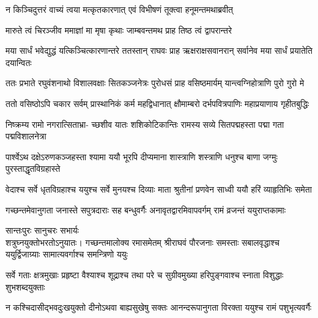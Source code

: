 \twolineshloka
{न किञ्चिदुत्तरं वाच्यं त्वया मत्कृतकारणात्}
{एवं विभीषणं तूक्त्वा हनूमन्तमथाब्रवीत्} %

\twolineshloka
{मारुते त्वं चिरञ्जीव ममाज्ञां मा मृषा कृथाः}
{जाम्बवन्तमथ प्राह तिष्ठ त्वं द्वापरान्तरे} %

\threelineshloka
{मया सार्धं भवेद्युद्धं यत्किञ्चित्कारणान्तरे}
{ततस्तान् राघवः प्राह ऋक्षराक्षसवानरान्}
{सर्वानेव मया सार्धं प्रयातेति दयान्वितः} %

\fourlineindentedshloka
{ततः प्रभाते रघुवंशनाथो}
{विशालवक्षाः सितकञ्जनेत्रः}
{पुरोधसं प्राह वसिष्ठमार्यम्}
{यान्त्वग्निहोत्राणि पुरो गुरो मे} %

\fourlineindentedshloka
{ततो वसिष्ठोऽपि चकार सर्वम्}
{प्रास्थानिकं कर्म महद्विधानात्}
{क्षौमाम्बरो दर्भपवित्रपाणिः}
{महाप्रयाणाय गृहीतबुद्धिः} %

\fourlineindentedshloka
{निष्क्रम्य रामो नगरात्सिताभ्रा-}
{च्छशीव यातः शशिकोटिकान्तिः}
{रामस्य सव्ये सितपद्महस्ता}
{पद्मा गता पद्मविशालनेत्रा} %

\fourlineindentedshloka
{पार्श्वेऽथ दक्षेऽरुणकञ्जहस्ता}
{श्यामा ययौ भूरपि दीप्यमाना}
{शास्त्राणि शस्त्राणि धनुश्च बाणा}
{जग्मुः पुरस्ताद्धृतविग्रहास्ते} %

\fourlineindentedshloka
{वेदाश्च सर्वे धृतविग्रहाश्च}
{ययुश्च सर्वे मुनयश्च दिव्याः}
{माता श्रुतीनां प्रणवेन साध्वी}
{ययौ हरिं व्याहृतिभिः समेता} %

\fourlineindentedshloka
{गच्छन्तमेवानुगता जनास्ते}
{सपुत्रदाराः सह बन्धुवर्गैः}
{अनावृतद्वारमिवापवर्गम्}
{रामं व्रजन्तं ययुराप्तकामाः}%

\begin{minipage}{\linewidth}
\centering
{\hspace{-9ex}सान्तःपुरः\hspace{0.5ex} सानुचरः \hspace{0.5ex}सभार्यः}\\
{\hspace{-1ex}शत्रुघ्नयुक्तो\hspace{3ex}भरतोऽनुयातः।}
\fourlineindentedshloka
{गच्छन्तमालोक्य रमासमेतम्}
{श्रीराघवं पौरजनाः समस्ताः}
{सबालवृद्धाश्च ययुर्द्विजाग्र्याः}
{सामात्यवर्गाश्च समन्त्रिणो ययुः} %
\end{minipage}

\fourlineindentedshloka
{सर्वे गताः क्षत्रमुखाः प्रहृष्टा}
{वैश्याश्च शूद्राश्च तथा परे च}
{सुग्रीवमुख्या हरिपुङ्गवाश्च}
{स्नाता विशुद्धाः शुभशब्दयुक्ताः} %

\fourlineindentedshloka
{न कश्चिदासीद्भवदुःखयुक्तो}
{दीनोऽथवा बाह्यसुखेषु सक्तः}
{आनन्दरूपानुगता विरक्ता}
{ययुश्च रामं पशुभृत्यवर्गैः} %

